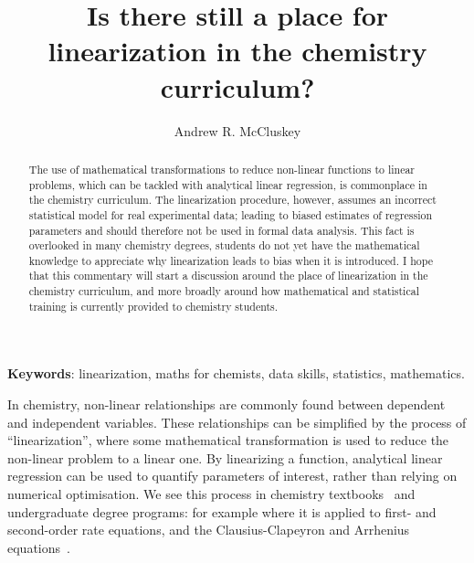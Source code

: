 \documentclass[journal=jceda8,manuscript=article]{achemso}
\author{Andrew R. McCluskey}
\affiliation{School of Chemistry, University of Bristol, Cantock's Close, Bristol, BS8 1TS, United Kingdom}
\title{Is there still a place for linearization in the chemistry curriculum?}
\begin{document}
\begin{abstract}
    The use of mathematical transformations to reduce non-linear functions to linear problems, which can be tackled with analytical linear regression, is commonplace in the chemistry curriculum. 
    The linearization procedure, however, assumes an incorrect statistical model for real experimental data; leading to biased estimates of regression parameters and should therefore not be used in formal data analysis. 
    This fact is overlooked in many chemistry degrees, students do not yet have the mathematical knowledge to appreciate why linearization leads to bias when it is introduced.
    I hope that this commentary will start a discussion around the place of linearization in the chemistry curriculum, and more broadly around how mathematical and statistical training is currently provided to chemistry students. 
\end{abstract}

\noindent\textbf{Keywords}: linearization, maths for chemists, data skills, statistics, mathematics.

\maketitle 

In chemistry, non-linear relationships are commonly found between dependent and independent variables.
These relationships can be simplified by the process of ``linearization'', where some mathematical transformation is used to reduce the non-linear problem to a linear one. 
By linearizing a function, analytical linear regression can be used to quantify parameters of interest, rather than relying on numerical optimisation. 
We see this process in chemistry textbooks~\cite{monk_math_2010,atkins_physical_2018} and undergraduate degree programs: for example where it is applied to first- and second-order rate equations, and the Clausius-Clapeyron and Arrhenius equations~\cite{perrin_linear_2017,harper_data_2017,monk_math_2010}.
\end{document}
